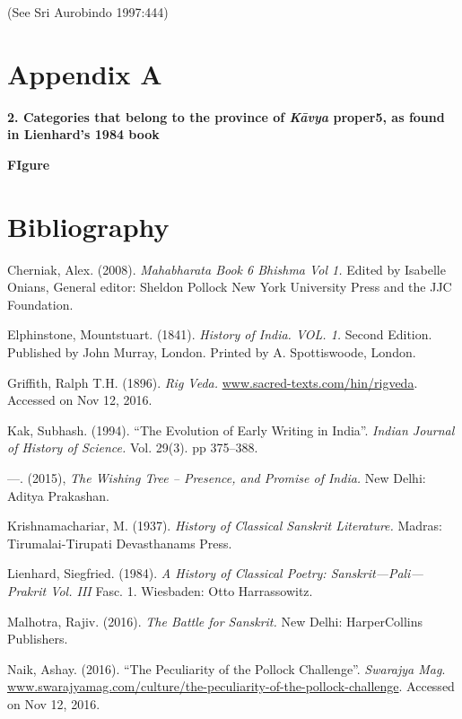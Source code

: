 \begin{flushright}
(See Sri Aurobindo 1997:444)
\end{flushright}


\section*{Appendix A}

\textbf{2. Categories that belong to the province of \textit{Kāvya} proper5, as found in Lienhard’s 1984 book}

\textbf{FIgure}


\section*{Bibliography}

\begin{thebibliography}{99}
 Cherniak, Alex. (2008). \textit{Mahabharata Book 6 Bhishma Vol 1.} Edited by Isabelle Onians, General editor: Sheldon Pollock New York University Press and the JJC Foundation.

  Elphinstone, Mountstuart. (1841). \textit{History of India. VOL. 1.} Second Edition. Published by John Murray, London. Printed by A. Spottiswoode, London.

  Griffith, Ralph T.H. (1896). \textit{Rig Veda.} \url{www.sacred-texts.com/hin/rigveda}. Accessed on Nov 12, 2016.

  Kak, Subhash. (1994). “The Evolution of Early Writing in India”. \textit{Indian Journal of History of Science.} Vol. 29(3). pp 375–388.

  —. (2015), \textit{The Wishing Tree – Presence, and Promise of India.} New Delhi: Aditya Prakashan.

  Krishnamachariar, M. (1937). \textit{History of Classical Sanskrit Literature.} Madras: Tirumalai-Tirupati Devasthanams Press.

  Lienhard, Siegfried. (1984). \textit{A History of Classical Poetry: Sanskrit—Pali—Prakrit Vol. III} Fasc. 1. Wiesbaden: Otto Harrassowitz.

  Malhotra, Rajiv. (2016). \textit{The Battle for Sanskrit.} New Delhi: HarperCollins Publishers.

  Naik, Ashay. (2016). “The Peculiarity of the Pollock Challenge”. \textit{Swarajya Mag}. \url{www.swarajyamag.com/culture/the-peculiarity-of-the-pollock-challenge}. Accessed on Nov 12, 2016.


\end{thebibliography}
